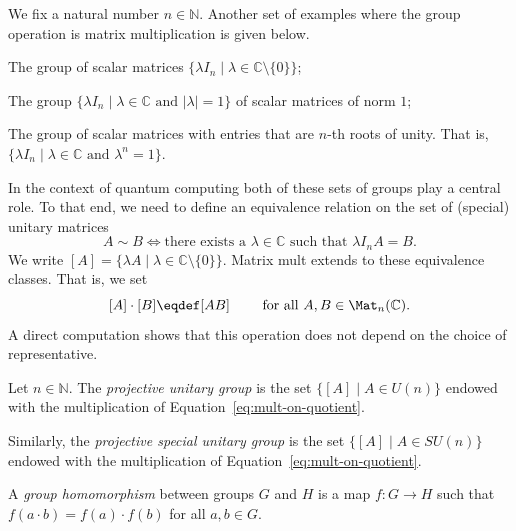 \documentclass[a4paper,oneside, 12pt]{amsart}
\begin{document}
\begin{example}\label{ex:central-stuff}
  We fix a natural number \(n\in \mathbb{N}\).
  Another set of examples where the group operation is matrix multiplication is given below.
  \begin{thmlist}
    \item The group of scalar matrices \( \{\lambda I_n \mid \lambda \in  \mathbb{C}\setminus\{0\}\} \);
    \item The group \( \{\lambda I_n \mid \lambda \in \mathbb{C} \text{ and } |\lambda| = 1\} \) of scalar matrices of norm \(1\);
    \item The group of scalar matrices with entries that are \(n\)-th roots of unity.
    That is, \( \{\lambda I_n \mid \lambda \in \mathbb{C} \text{ and } \lambda^n = 1\} \).
  \end{thmlist}
\end{example}

In the context of quantum computing both of these sets of groups play a central role.
To that end, we need to define an equivalence relation on the set of (special) unitary matrices
\begin{equation}
  A\sim B \iff \text{there exists a } \lambda \in \mathbb{C} \text{ such that } \lambda I_{n} A= B.
\end{equation}
We write \([A] =\{ \lambda A \mid \lambda \in \mathbb{C}\setminus\{0\} \}\).
Matrix mult extends to these equivalence classes.
That is, we set
\begin{equation}\label{eq:mult-on-quotient}
  [A] \cdot [B] \eqdef [AB] \qquad \text{ for all } A, B \in \Mat_{n} ( \mathbb{C}).
\end{equation}
A direct computation shows that this operation does not  depend on the choice of representative.
\begin{definition}\label{def:pun-sun}
  Let \(n\in \mathbb{N}\).
  The \emph{ projective unitary group} is the set \(\{[A] \mid A \in U(n)\}\) endowed with the multiplication of Equation~\ref{eq:mult-on-quotient}.

  Similarly, the \emph{projective special unitary group} is the set \(\{[A] \mid A \in SU(n)\}\) endowed with the multiplication of Equation~\ref{eq:mult-on-quotient}.
\end{definition}

\begin{definition}\label{def:group-homomorphism}
  A \emph{group homomorphism} between groups \( G \) and \( H \) is a map \( f \colon G \to H \) such that \(f(a \cdot b) = f(a) \cdot f(b)\) for all \( a, b \in G \).
\end{definition}
\end{document}
